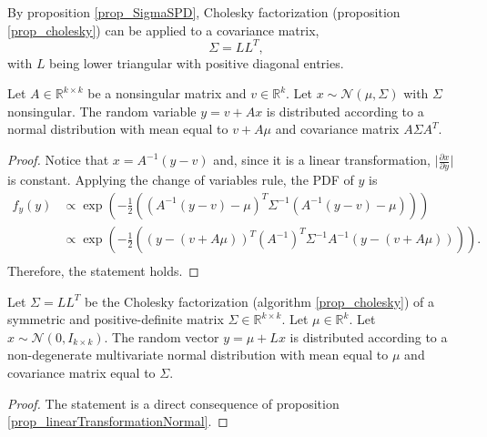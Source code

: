 By proposition \ref{prop_SigmaSPD}, Cholesky factorization (proposition \ref{prop_cholesky}) can be applied to a covariance matrix, 
$$\Sigma = LL^T,$$ 
with $L$ being lower triangular with positive diagonal entries.

\begin{proposition} \label{prop_linearTransformationNormal}
  Let $A \in \mathbb{R}^{k \times k}$ be a nonsingular matrix and $v \in \mathbb{R}^k$. Let $x \sim \mathcal{N}(\mu, \Sigma)$ with $\Sigma$ nonsingular. The random variable $y = v+Ax$ is distributed according to a normal distribution with mean equal to $v + A\mu$ and covariance matrix $A\Sigma A^T$.
  \begin{proof}
    Notice that $x = A^{-1}(y-v)$ and, since it is a linear transformation, $\lvert \frac{\partial x}{ \partial y} \rvert$ is constant. Applying the change of variables rule, the PDF of $y$ is
    $$
     \begin{aligned}
       f_y(y) &\propto \exp \left( 
                            -\frac{1}{2} 
                            \left( 
                              \left( A^{-1}(y-v)-\mu \right)^T
                              \Sigma^{-1} 
                              \left( A^{-1}(y-v)-\mu \right)
                            \right) 
                          \right) \\
              &\propto \exp \left( 
                            -\frac{1}{2} 
                            \left( 
                              \left( y-(v+A\mu) \right)^T
                              (A^{-1})^T\Sigma^{-1}A^{-1} 
                              \left( y-(v+A\mu) \right)
                            \right) 
                          \right). \\
     \end{aligned}
    $$
  Therefore, the statement holds.
  \end{proof}
\end{proposition}

\begin{corollary} \label{corollary_nonStandardNormalFromStandardNormal}
Let $\Sigma = LL^T$ be the Cholesky factorization (algorithm \ref{prop_cholesky}) of a symmetric and positive\hyp{}definite matrix $\Sigma \in \mathbb{R}^{k \times k}$. Let $\mu \in \mathbb{R}^k$. Let $x \sim \mathcal{N}(0,I_{k \times k})$. The random vector $y = \mu + Lx$ is distributed according to a non-degenerate multivariate normal distribution with mean equal to $\mu$ and covariance matrix equal to $\Sigma$.
\begin{proof}
  The statement is a direct consequence of proposition \ref{prop_linearTransformationNormal}.
\end{proof} 
\end{corollary}

